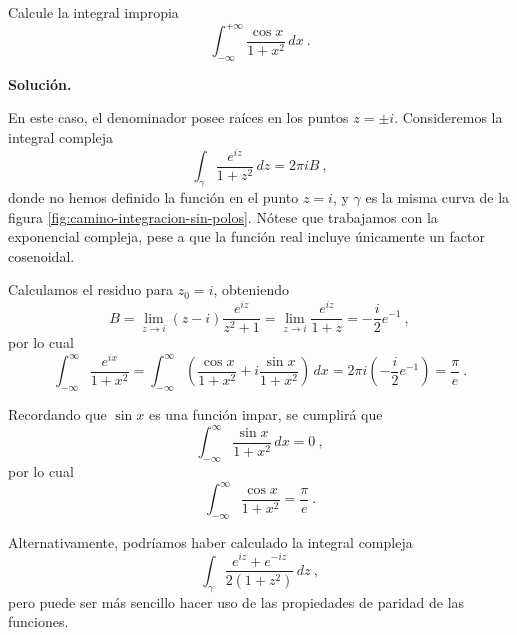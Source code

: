 \begin{ejemplo}
    Calcule la integral impropia
    \begin{equation*}
        \int_{-\infty}^{+\infty} \frac{\cos x}{1+x^2} \, dx \ .
    \end{equation*}

    \noindent \textbf{Solución.}

    En este caso, el denominador posee raíces en los puntos $z = \pm i$. Consideremos la integral compleja
    \begin{equation*}
        \int_{\gamma} \frac{e^{iz}}{1+z^2} \, dz = 2\pi i B \ ,
    \end{equation*}
    donde no hemos definido la función en el punto $z = i$, y $\gamma$ es la misma curva de la figura \ref{fig:camino-integracion-sin-polos}. Nótese que trabajamos con la exponencial compleja, pese a que la función real incluye únicamente un factor cosenoidal.

    Calculamos el residuo para $z_0 = i$, obteniendo
    \begin{equation*}
        B = \lim_{z \to i} (z-i) \frac{e^{iz}}{z^2+1} = \lim_{z \to i} \frac{e^{iz}}{1+z} = -\frac{i}{2}e^{-1} \ ,
    \end{equation*}
    por lo cual
    \begin{equation*}
        \int_{-\infty}^\infty \frac{e^{ix}}{1+x^2} = \int_{-\infty}^\infty \left( \frac{\cos x}{1+x^2} + i \frac{\sin x}{1+x^2} \right) \, dx = 2\pi i \left( -\frac{i}{2}e^{-1} \right) = \frac{\pi}{e} \ .
    \end{equation*}

    Recordando que $\sin x$ es una función impar, se cumplirá que 
    \begin{equation*}
        \int_{-\infty}^\infty \frac{\sin x}{1+x^2} \, dx = 0 \ ,
    \end{equation*}
    por lo cual
    \begin{equation*}
        \int_{-\infty}^\infty \frac{\cos x}{1+x^2} = \frac{\pi}{e} \ .
    \end{equation*}

    Alternativamente, podríamos haber calculado la integral compleja 
    \begin{equation*}
        \int_{\gamma} \frac{e^{iz} + e^{-iz}}{2 (1+z^2)} \, dz \ ,
    \end{equation*}
    pero puede ser más sencillo hacer uso de las propiedades de paridad de las funciones.
\end{ejemplo}

